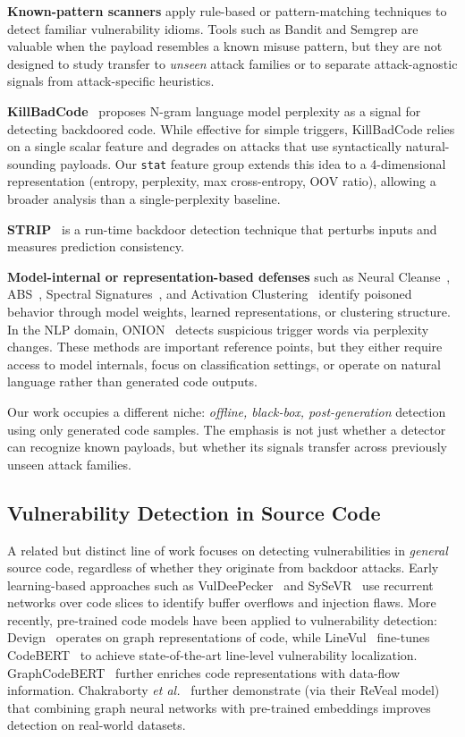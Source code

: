 ﻿\documentclass[sigconf,review,anonymous]{acmart}
\begin{document}
\textbf{Known-pattern scanners} apply rule-based or pattern-matching
techniques to detect familiar vulnerability idioms. Tools such as Bandit and
Semgrep are valuable when the payload resembles a known misuse pattern, but
they are not designed to study transfer to \emph{unseen} attack families or to
separate attack-agnostic signals from attack-specific heuristics.

\textbf{KillBadCode}~\cite{chen2023killbadcode} proposes N-gram language model
perplexity as a signal for detecting backdoored code.
While effective for simple triggers, KillBadCode relies on a single scalar
feature and degrades on attacks that use syntactically natural-sounding payloads.
Our \texttt{stat} feature group extends this idea to a 4-dimensional
representation (entropy, perplexity, max cross-entropy, OOV ratio),
allowing a broader analysis than a single-perplexity baseline.

\textbf{STRIP}~\cite{gao2019strip} is a run-time backdoor detection technique
that perturbs inputs and measures prediction consistency.

\textbf{Model-internal or representation-based defenses} such as Neural
Cleanse~\cite{wang2019nc}, ABS~\cite{liu2019abs}, Spectral
Signatures~\cite{tran2018spectral}, and Activation
Clustering~\cite{chen2019activation} identify poisoned behavior through model
weights, learned representations, or clustering structure. In the NLP domain,
ONION~\cite{qi2021onion} detects suspicious trigger words via perplexity
changes. These methods are important reference points, but they either require
access to model internals, focus on classification settings, or operate on
natural language rather than generated code outputs.

Our work occupies a different niche: \emph{offline, black-box,
post-generation} detection using only generated code samples. The emphasis is
not just whether a detector can recognize known payloads, but whether its
signals transfer across previously unseen attack families.

\subsection{Vulnerability Detection in Source Code}

A related but distinct line of work focuses on detecting vulnerabilities in
\emph{general} source code, regardless of whether they originate from backdoor
attacks.
Early learning-based approaches such as VulDeePecker~\cite{li2018vuldeepecker}
and SySeVR~\cite{li2021sysevr} use recurrent networks over code slices to
identify buffer overflows and injection flaws.
More recently, pre-trained code models have been applied to vulnerability
detection: Devign~\cite{zhou2019devign} operates on graph representations of
code, while LineVul~\cite{fu2022linevul} fine-tunes CodeBERT~\cite{feng2020codebert}
to achieve state-of-the-art line-level vulnerability localization.
GraphCodeBERT~\cite{guo2021graphcodebert} further enriches code representations
with data-flow information.
Chakraborty \textit{et al.}~\cite{chakraborty2022reveal} further demonstrate
(via their ReVeal model) that combining graph neural networks with pre-trained
embeddings improves detection on real-world datasets.
\end{document}

